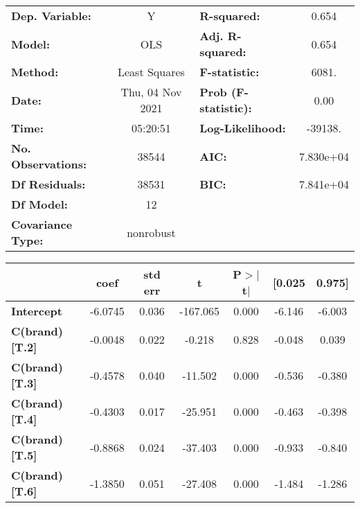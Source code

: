 
\begin{center}
\begin{tabular}{lclc}
\toprule
\textbf{Dep. Variable:}    &        Y         & \textbf{  R-squared:         } &     0.654   \\
\textbf{Model:}            &       OLS        & \textbf{  Adj. R-squared:    } &     0.654   \\
\textbf{Method:}           &  Least Squares   & \textbf{  F-statistic:       } &     6081.   \\
\textbf{Date:}             & Thu, 04 Nov 2021 & \textbf{  Prob (F-statistic):} &     0.00    \\
\textbf{Time:}             &     05:20:51     & \textbf{  Log-Likelihood:    } &   -39138.   \\
\textbf{No. Observations:} &       38544      & \textbf{  AIC:               } & 7.830e+04   \\
\textbf{Df Residuals:}     &       38531      & \textbf{  BIC:               } & 7.841e+04   \\
\textbf{Df Model:}         &          12      & \textbf{                     } &             \\
\textbf{Covariance Type:}  &    nonrobust     & \textbf{                     } &             \\
\bottomrule
\end{tabular}
\begin{tabular}{lcccccc}
                        & \textbf{coef} & \textbf{std err} & \textbf{t} & \textbf{P$> |$t$|$} & \textbf{[0.025} & \textbf{0.975]}  \\
\midrule
\textbf{Intercept}      &      -6.0745  &        0.036     &  -167.065  &         0.000        &       -6.146    &       -6.003     \\
\textbf{C(brand)[T.2]}  &      -0.0048  &        0.022     &    -0.218  &         0.828        &       -0.048    &        0.039     \\
\textbf{C(brand)[T.3]}  &      -0.4578  &        0.040     &   -11.502  &         0.000        &       -0.536    &       -0.380     \\
\textbf{C(brand)[T.4]}  &      -0.4303  &        0.017     &   -25.951  &         0.000        &       -0.463    &       -0.398     \\
\textbf{C(brand)[T.5]}  &      -0.8868  &        0.024     &   -37.403  &         0.000        &       -0.933    &       -0.840     \\
\textbf{C(brand)[T.6]}  &      -1.3850  &        0.051     &   -27.408  &         0.000        &       -1.484    &       -1.286     \\

\end{tabular}
\end{center}
